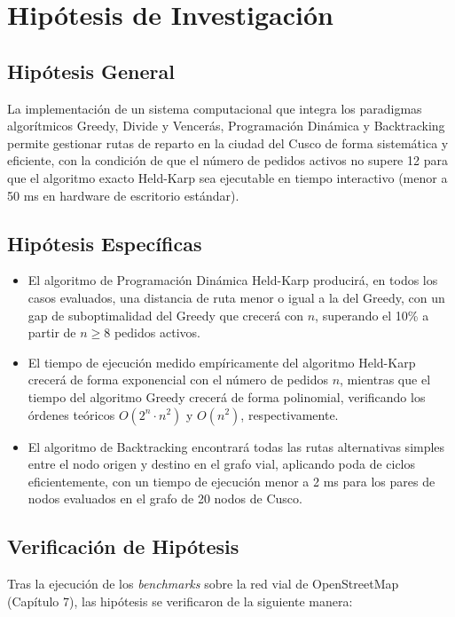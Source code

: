 \chapter{Hipótesis de Investigación}

\section{Hipótesis General}

La implementación de un sistema computacional que integra los paradigmas algorítmicos Greedy, Divide y Vencerás, Programación Dinámica y Backtracking permite gestionar rutas de reparto en la ciudad del Cusco de forma sistemática y eficiente, con la condición de que el número de pedidos activos no supere 12 para que el algoritmo exacto Held-Karp sea ejecutable en tiempo interactivo (menor a 50 ms en hardware de escritorio estándar).

\section{Hipótesis Específicas}

\begin{itemize}
    \item El algoritmo de Programación Dinámica Held-Karp producirá, en todos los casos evaluados, una distancia de ruta menor o igual a la del Greedy, con un gap de suboptimalidad del Greedy que crecerá con $n$, superando el 10\% a partir de $n \geq 8$ pedidos activos.
    \item El tiempo de ejecución medido empíricamente del algoritmo Held-Karp crecerá de forma exponencial con el número de pedidos $n$, mientras que el tiempo del algoritmo Greedy crecerá de forma polinomial, verificando los órdenes teóricos $O(2^n \cdot n^2)$ y $O(n^2)$, respectivamente.
    \item El algoritmo de Backtracking encontrará todas las rutas alternativas simples entre el nodo origen y destino en el grafo vial, aplicando poda de ciclos eficientemente, con un tiempo de ejecución menor a 2 ms para los pares de nodos evaluados en el grafo de 20 nodos de Cusco.
\end{itemize}

\section{Verificación de Hipótesis}

Tras la ejecución de los \textit{benchmarks} sobre la red vial de OpenStreetMap (Capítulo 7), las hipótesis se verificaron de la siguiente manera:

